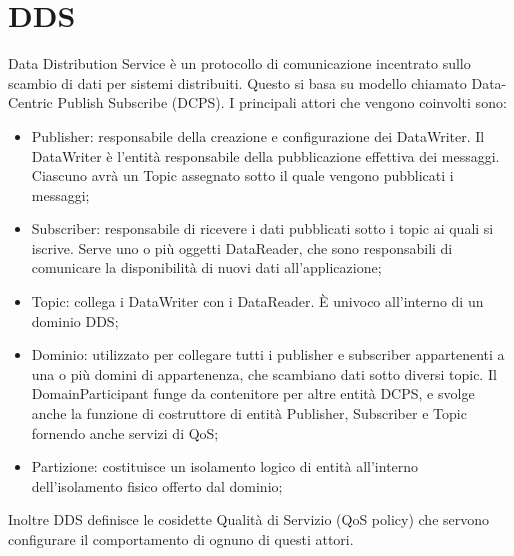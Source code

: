 \section{DDS}
Data Distribution Service è un protocollo di comunicazione incentrato sullo scambio di dati per sistemi distribuiti. Questo si basa su modello chiamato Data-Centric Publish Subscribe (DCPS). I principali attori che vengono coinvolti sono:
\begin{itemize}
    \item Publisher: responsabile della creazione e configurazione dei DataWriter. Il DataWriter è l'entità responsabile della pubblicazione effettiva dei messaggi. Ciascuno avrà un Topic assegnato sotto il quale vengono pubblicati i messaggi;\label{actor:publisher}

    \item Subscriber: responsabile di ricevere i dati pubblicati sotto i topic ai quali si iscrive. Serve uno o più oggetti DataReader, che sono responsabili di comunicare la disponibilità di nuovi dati all'applicazione;\label{actor:subscriber}

    \item Topic: collega i DataWriter con i DataReader. È univoco all'interno di un dominio DDS;\@
    
    \item Dominio: utilizzato per collegare tutti i publisher e subscriber appartenenti a una o più domini di appartenenza, che scambiano dati sotto diversi topic. Il DomainParticipant funge da contenitore per altre entità DCPS, e svolge anche la funzione di costruttore di entità Publisher, Subscriber e Topic fornendo anche servizi di QoS;\@

    \item Partizione: costituisce un isolamento logico di entità all'interno dell'isolamento fisico offerto dal dominio;

\end{itemize}
Inoltre DDS definisce le cosidette Qualità di Servizio (QoS policy) che servono configurare il comportamento di ognuno di questi attori.


